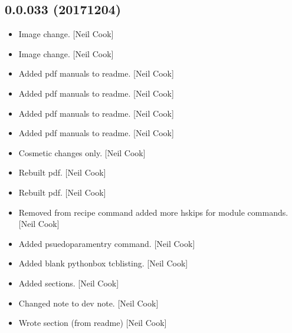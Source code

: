\documentclass[a4paper,10pt,english]{report}
\begin{document}
\subsection{0.0.033 (2017\sphinxhyphen{}12\sphinxhyphen{}04)}
\label{\detokenize{misc/changelog:id537}}\begin{itemize}
\item {} 
Image change. {[}Neil Cook{]}

\item {} 
Image change. {[}Neil Cook{]}

\item {} 
Added pdf manuals to readme. {[}Neil Cook{]}

\item {} 
Added pdf manuals to readme. {[}Neil Cook{]}

\item {} 
Added pdf manuals to readme. {[}Neil Cook{]}

\item {} 
Added pdf manuals to readme. {[}Neil Cook{]}

\item {} 
Cosmetic changes only. {[}Neil Cook{]}

\item {} 
Rebuilt pdf. {[}Neil Cook{]}

\item {} 
Rebuilt pdf. {[}Neil Cook{]}

\item {} 
Removed  from recipe command added more hskips for module commands.
{[}Neil Cook{]}

\item {} 
Added psuedoparamentry command. {[}Neil Cook{]}

\item {} 
Added blank pythonbox tcblisting. {[}Neil Cook{]}

\item {} 
Added sections. {[}Neil Cook{]}

\item {} 
Changed note to dev note. {[}Neil Cook{]}

\item {} 
Wrote section (from readme) {[}Neil Cook{]}

\end{itemize}
\end{document}
